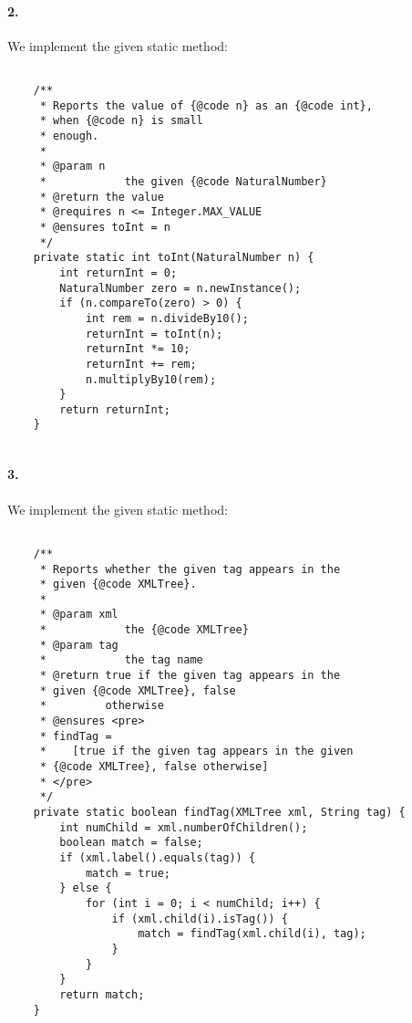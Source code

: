 \documentclass[10pt]{article}
\begin{document}
\paragraph{2. } We implement the given static method: 
\begin{lstlisting} 

    /**
     * Reports the value of {@code n} as an {@code int},
     * when {@code n} is small
     * enough.
     *
     * @param n
     *            the given {@code NaturalNumber}
     * @return the value
     * @requires n <= Integer.MAX_VALUE
     * @ensures toInt = n
     */
    private static int toInt(NaturalNumber n) {
        int returnInt = 0;
        NaturalNumber zero = n.newInstance();
        if (n.compareTo(zero) > 0) {
            int rem = n.divideBy10();
            returnInt = toInt(n);
            returnInt *= 10;
            returnInt += rem;
            n.multiplyBy10(rem);
        }
        return returnInt;
    }
    

\end{lstlisting}

\paragraph{3. } We implement the given static method: 
\begin{lstlisting} 

    /**
     * Reports whether the given tag appears in the 
     * given {@code XMLTree}.
     *
     * @param xml
     *            the {@code XMLTree}
     * @param tag
     *            the tag name
     * @return true if the given tag appears in the 
     * given {@code XMLTree}, false
     *         otherwise
     * @ensures <pre>
     * findTag =
     *    [true if the given tag appears in the given 
     * {@code XMLTree}, false otherwise]
     * </pre>
     */
    private static boolean findTag(XMLTree xml, String tag) {
        int numChild = xml.numberOfChildren();
        boolean match = false;
        if (xml.label().equals(tag)) {
            match = true;
        } else {
            for (int i = 0; i < numChild; i++) {
                if (xml.child(i).isTag()) {
                    match = findTag(xml.child(i), tag);
                }
            }
        }
        return match;
    }
\end{lstlisting}
\end{document}
